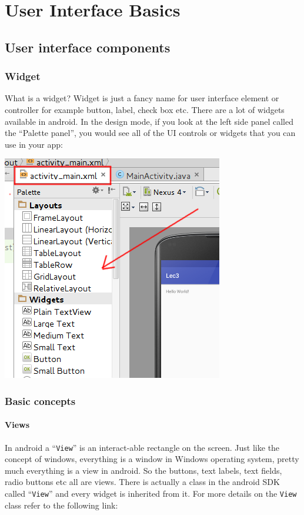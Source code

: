\chapter{User Interface Basics}

\section{User interface components}
\subsection{Widget}
What is a widget? Widget is just a fancy name for user interface element or controller for example button, label, check box etc. There are a lot of widgets available in android. In the design mode, if you look at the left side panel called the ``Palette panel'', you would see all of the UI controls or widgets that you can use in your app:

\begin{center}
	\includegraphics[scale=0.4]{chapters/ch03/images/1_palette_panel}
\end{center}

\subsection{Basic concepts}

\subsubsection{Views}
In android a ``\texttt{View}'' is an interact-able rectangle on the screen. Just like the concept of windows, everything is a window in Windows operating system, pretty much everything is a view in android. So the buttons, text labels, text fields, radio buttons etc all are views. There is actually a class in the android SDK called ``\texttt{View}'' and every widget is inherited from it. For more details on the \texttt{View} class refer to the following link:

